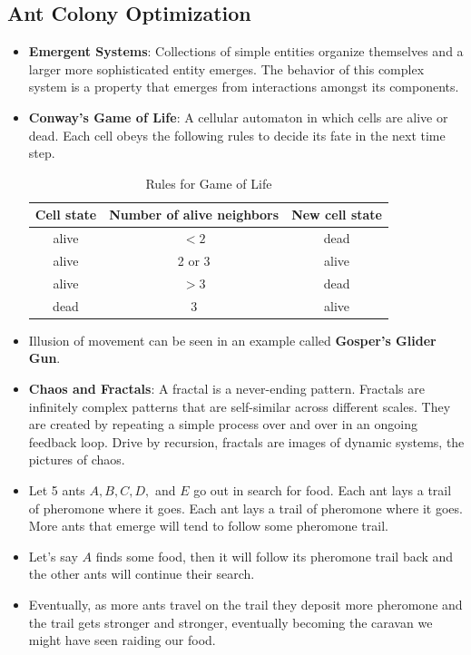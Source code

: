 \documentclass[a4paper]{article}
\begin{document}
\subsection{Ant Colony Optimization}
\begin{itemize}
    \item \textbf{Emergent Systems}: Collections of simple entities organize themselves and a larger more sophisticated entity emerges. The behavior of this complex system is a property that emerges from interactions amongst its components.
    \item \textbf{Conway's Game of Life}: A cellular automaton in which cells are alive or dead. Each cell obeys the following rules to decide its fate in the next time step.
    \begin{table}[H]
        \centering
        \begin{tabular}{|c|c|c|}
            \hline
            Cell state & Number of alive neighbors & New cell state \\
            \hline
            alive & $<2$ & dead \\
            \hline
            alive & 2 or 3 & alive \\
            \hline
            alive & $>3$ & dead \\
            \hline
            dead & 3 & alive \\
            \hline
        \end{tabular}
        \caption{Rules for Game of Life}
        \label{tab:AI-rules-game-life}
    \end{table}
    \item Illusion of movement can be seen in an example called \textbf{Gosper's Glider Gun}.
    \item \textbf{Chaos and Fractals}: A fractal is a never-ending pattern. Fractals are infinitely complex patterns that are self-similar across different scales. They are created by repeating a simple process over and over in an ongoing feedback loop. Drive by recursion, fractals are images of dynamic systems, the pictures of chaos.
    \item Let 5 ants $A,B,C,D,$ and $E$ go out in search for food. Each ant lays a trail of pheromone where it goes. Each ant lays a trail of pheromone where it goes. More ants that emerge will tend to follow some pheromone trail.
    \item Let's say $A$ finds some food, then it will follow its pheromone trail back and the other ants will continue their search.
    \item Eventually, as more ants travel on the trail they deposit more pheromone and the trail gets stronger and stronger, eventually becoming the caravan we might have seen raiding our food. 

\end{itemize}
\end{document}
